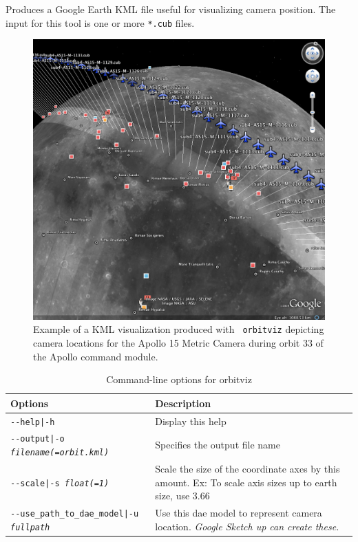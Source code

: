 Produces a Google Earth \ac{KML} file useful for visualizing camera
position. The input for this tool is one or more \texttt{*.cub} files.

\begin{figure}[!t]
  \begin{center}
  \includegraphics[width=6in]{images/orbitviz_ge_result.png}
  \end{center}
  \caption{ Example of a \ac{KML} visualization produced with {\tt
      orbitviz} depicting camera locations for the Apollo 15 Metric
    Camera during orbit 33 of the Apollo command module.}
  \label{fig:orbitviz_example}
\end{figure}

\begin{longtable}{|l|p{10cm}|}
\caption{Command-line options for orbitviz}
\label{tbl:orbitviz}
\endfirsthead
\endhead
\endfoot
\endlastfoot
\hline
Options & Description \\ \hline \hline
\texttt{-\/-help|-h} & Display this help \\ \hline
\texttt{-\/-output|-o \textit{filename(=orbit.kml)}} & Specifies the output file name \\ \hline
\texttt{-\/-scale|-s \textit{float(=1)}} & Scale the size of the coordinate axes by this amount. Ex: To scale axis sizes up to earth size, use 3.66 \\ \hline
\texttt{-\/-use\_path\_to\_dae\_model|-u \textit{fullpath}} & Use this dae model to represent camera location. \emph{Google Sketch up can create these.} \\ \hline
\end{longtable}


